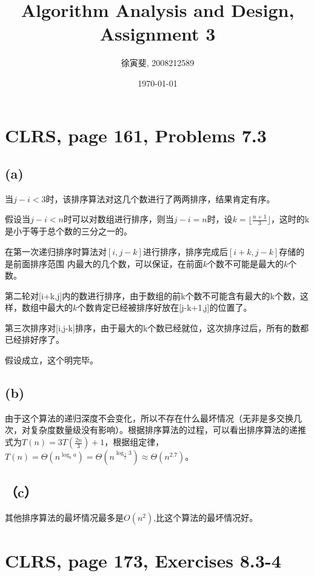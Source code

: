 \documentclass{article}
\begin{document}
\begin{CJK}{UTF8}{gbsn}
\title{Algorithm Analysis and Design, Assignment 3}
\author{徐寅斐, 2008212589}
\date{\today}
\maketitle

\section{CLRS, page 161, Problems 7.3}
\subsection*{(a)}

当$j-i<3$时，该排序算法对这几个数进行了两两排序，结果肯定有序。

假设当$j-i<n$时可以对数组进行排序，则当$j-i=n$时，设$k =
\lfloor
\frac{n+1}{3}\rfloor$，这时的k是小于等于总个数的三分之一的。

在第一次递归排序时算法对$[i,j-k]$进行排序，排序完成后$[i+k,j-k]$存储的是前面排序范围
内最大的几个数，可以保证，在前面$k$个数不可能是最大的$k$个数。

第二轮对[i+k,j]内的数进行排序，由于数组的前k个数不可能含有最大的k个数，这样，数组中最大的$k$个数肯定已经被排序好放在[j-k+1,j]的位置了。

第三次排序对[i,j-k]排序，由于最大的k个数已经就位，这次排序过后，所有的数都已经排好序了。

假设成立，这个明完毕。

\subsection*{(b)}

由于这个算法的递归深度不会变化，所以不存在什么最坏情况（无非是多交换几次，对复杂度数量级没有影响）。根据排序算法的过程，可以看出排序算法的递推式为$T(n) =
3T(\frac{2n}{3}) +1 $，根据组定律，$T(n) = \Theta( n^{{\log_b}a}) =
\Theta(n^{{\log_\frac{3}{2}}3}) \approx \Theta(n^{2.7})$。

\subsection*{（c）}
其他排序算法的最坏情况最多是$O(n^2)$,比这个算法的最坏情况好。

\section{CLRS, page 173, Exercises 8.3-4}

\end{CJK}
\end{document}
